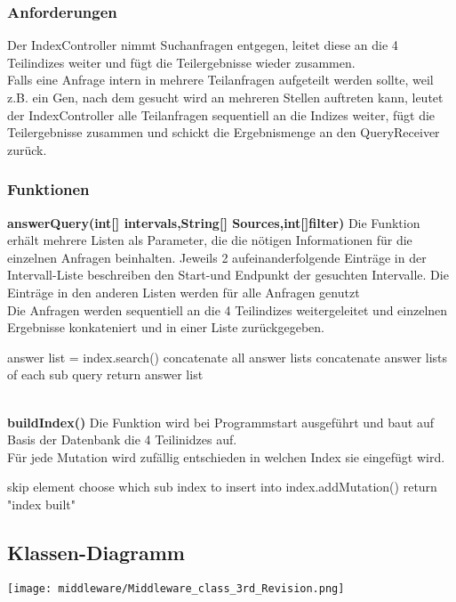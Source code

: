 \subsubsection{Anforderungen}
Der IndexController nimmt Suchanfragen entgegen, leitet diese an die 4 Teilindizes weiter und fügt die Teilergebnisse wieder zusammen.\\Falls eine Anfrage intern in mehrere Teilanfragen aufgeteilt werden sollte, weil z.B. ein Gen, nach dem gesucht wird an mehreren Stellen auftreten kann, leutet der IndexController alle Teilanfragen sequentiell an die Indizes weiter, fügt die Teilergebnisse zusammen und schickt die Ergebnismenge an den QueryReceiver zurück.
\subsubsection{Funktionen}
\textbf{answerQuery(int[] intervals,String[] Sources,int[]filter)}
Die Funktion erhält mehrere Listen als Parameter, die die nötigen Informationen für die einzelnen Anfragen beinhalten. Jeweils 2 aufeinanderfolgende Einträge in der Intervall-Liste beschreiben den Start-und Endpunkt der gesuchten Intervalle. Die Einträge in den anderen Listen werden für alle Anfragen genutzt\\
Die Anfragen werden sequentiell an die 4 Teilindizes weitergeleitet und einzelnen Ergebnisse konkateniert und in einer Liste zurückgegeben.
\begin{algorithm}
{
{answer list = index.search()\;}
concatenate all answer lists\;
}
concatenate answer lists of each sub query\;
return answer list\;
\end{algorithm}
\\
\textbf{buildIndex()}
Die Funktion wird bei Programmstart ausgeführt und baut auf Basis der Datenbank die 4 Teilinidzes auf.\\
Für jede Mutation wird zufällig entschieden in welchen Index sie eingefügt wird.\\
\begin{algorithm}
{
{skip element\;}
choose which sub index to insert into\;
index.addMutation()\;
}
return "index built"\;
\end{algorithm}

\newpage
\subsection{Klassen-Diagramm}
\texttt{[image: middleware/Middleware\_class\_3rd\_Revision.png]}

